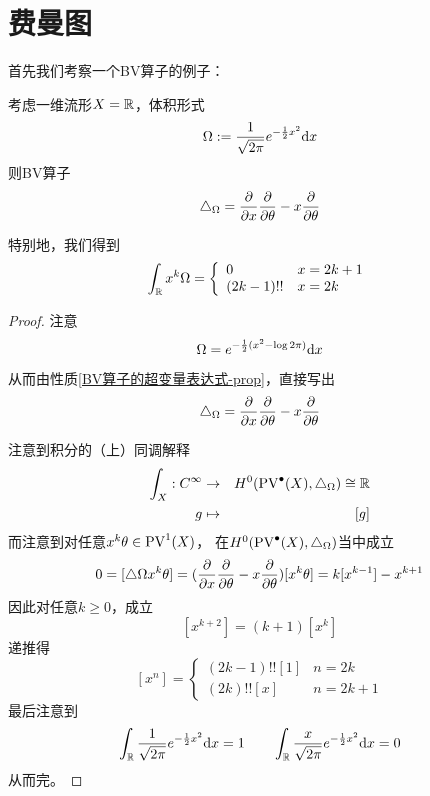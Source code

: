 
\section{费曼图}
首先我们考察一个BV算子的例子：
\begin{Example}
考虑一维流形$X=\mathbb{R}$，体积形式
$$\Omega:=\frac{1}{\sqrt{2\pi}}e^{-\frac{1}{2}x^2}\mathrm{d} x$$
则BV算子
$$\triangle_{\Omega}=\frac{\partial } {\partial x}\frac{\partial } {\partial \theta}-x\frac{\partial } {\partial \theta}$$

特别地，我们得到
$$
  \int_{\mathbb{R}} x^k\Omega
=
  \left\{
    \begin{array}{ll}
      0          &  x=2k+1\\
      (2k-1)!!   &  x=2k
    \end{array}
  \right.
$$
\end{Example}

\begin{proof}
注意
$$\Omega=e^{-\frac{1}{2}(x^2-\log 2\pi)}\mathrm{d} x$$
从而由性质\ref{BV算子的超变量表达式-prop}，直接写出
$$\triangle_{\Omega}=\frac{\partial } {\partial x}\frac{\partial } {\partial \theta}-x\frac{\partial } {\partial \theta}$$

注意到积分的（上）同调解释
\begin{eqnarray*}
  \int_X:C^{\infty}&\to& H^0(\operatorname{PV}^{\bullet}(X),\triangle_\Omega)\cong\mathbb{R}\\
  g&\mapsto& [g]
\end{eqnarray*}
而注意到对任意$x^k\theta\in \operatorname{PV}^1(X)$，
在$H^0(\operatorname{PV}^{\bullet}(X),\triangle_\Omega)$当中成立
$$0=[\triangle\Omega x^k\theta]=(\frac{\partial } {\partial x}\frac{\partial } {\partial \theta}-x\frac{\partial } {\partial \theta})[x^k\theta]
=k[x^{k-1}]-x^{k+1}$$
因此对任意$k\geq 0$，成立
$$[x^{k+2}]=(k+1)[x^k]$$
递推得
$$
  [x^n]=
  \left\{
    \begin{array}{ll}
      (2k-1)!![1]  & n=2k\\
      (2k)!![x]    & n=2k+1
    \end{array}
  \right.
$$
最后注意到
\begin{eqnarray*}
\int_{\mathbb{R}}
  \frac{1}{\sqrt{2\pi}}
  e^{-\frac{1}{2}x^2}\mathrm{d} x=1\qquad
\int_{\mathbb{R}}
  \frac{x}{\sqrt{2\pi}}
  e^{-\frac{1}{2}x^2}\mathrm{d} x=0
\end{eqnarray*}
从而完。
\end{proof}

